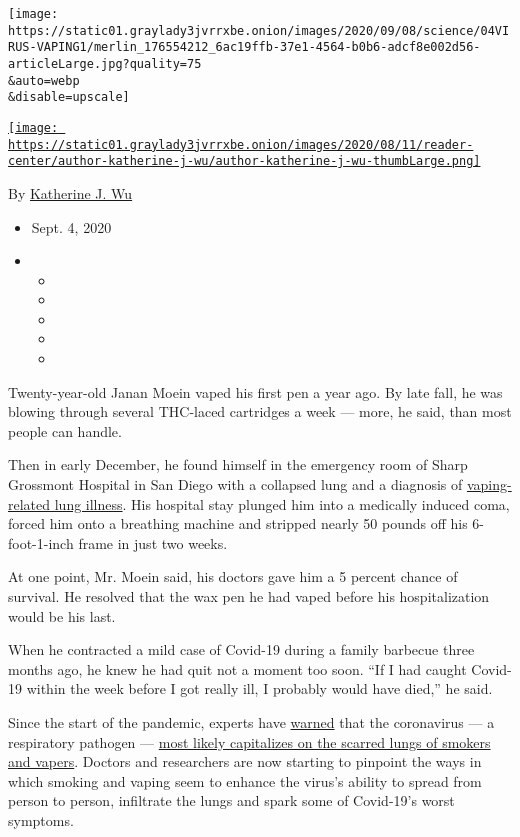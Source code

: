 \texttt{[image: https://static01.graylady3jvrrxbe.onion/images/2020/09/08/science/04VIRUS-VAPING1/merlin\_176554212\_6ac19ffb-37e1-4564-b0b6-adcf8e002d56-articleLarge.jpg?quality=75\\\&auto=webp\\\&disable=upscale]}

\href{https://www.nytimes3xbfgragh.onion/by/katherine-j--wu}{\texttt{[image: https://static01.graylady3jvrrxbe.onion/images/2020/08/11/reader-center/author-katherine-j-wu/author-katherine-j-wu-thumbLarge.png]}}

By
\href{https://www.nytimes3xbfgragh.onion/by/katherine-j--wu}{Katherine
J. Wu}

\begin{itemize}
\item
  Sept. 4, 2020
\item
  \begin{itemize}
  \item
  \item
  \item
  \item
  \item
  \end{itemize}
\end{itemize}

Twenty-year-old Janan Moein vaped his first pen a year ago. By late
fall, he was blowing through several THC-laced cartridges a week ---
more, he said, than most people can handle.

Then in early December, he found himself in the emergency room of Sharp
Grossmont Hospital in San Diego with a collapsed lung and a diagnosis of
\href{https://www.nytimes3xbfgragh.onion/2019/09/07/health/vaping-lung-illness.html}{vaping-related
lung illness}. His hospital stay plunged him into a medically induced
coma, forced him onto a breathing machine and stripped nearly 50 pounds
off his 6-foot-1-inch frame in just two weeks.

At one point, Mr. Moein said, his doctors gave him a 5 percent chance of
survival. He resolved that the wax pen he had vaped before his
hospitalization would be his last.

When he contracted a mild case of Covid-19 during a family barbecue
three months ago, he knew he had quit not a moment too soon. ``If I had
caught Covid-19 within the week before I got really ill, I probably
would have died,'' he said.

Since the start of the pandemic, experts have
\href{https://www.who.int/news-room/commentaries/detail/smoking-and-covid-19}{warned}
that the coronavirus --- a respiratory pathogen ---
\href{https://www.nytimes3xbfgragh.onion/2020/04/09/health/coronavirus-smoking-vaping-risks.html}{most
likely capitalizes on the scarred lungs of smokers and vapers}. Doctors
and researchers are now starting to pinpoint the ways in which smoking
and vaping seem to enhance the virus's ability to spread from person to
person, infiltrate the lungs and spark some of Covid-19's worst
symptoms.

